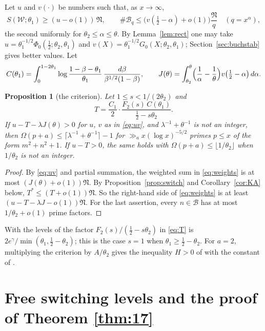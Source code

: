 \documentclass[11pt,a4paper]{amsart}
\newtheorem{proposition}[theorem]{Proposition}
\theoremstyle{remark}
\numberwithin{equation}{section}
\newcommand{\cB}{\mathcal B}
\newcommand{\cW}{\mathcal W}
\newcommand{\cN}{\mathfrak N}
\newcommand{\eg}{e^{\gamma}}
\begin{document}
Let $u$ and $v(\cdot)$ be numbers such that, as $x\to\infty$,
\begin{equation}\label{eq:uv}
S(\cW;\theta_1)\ge(u-o(1))\,\cN,\qquad \#\cB_q\le\bigl(v(\tfrac12-\alpha)+o(1)\bigr)\frac{\cN}{q}\quad(q=x^\alpha),
\end{equation}
the second uniformly for $\theta_2\le\alpha\le\theta$. By Lemma~\ref{lem:rect} one may take
$u=\theta_1^{-1/2}\Phi_0(\frac12;\theta_2,\theta_1)$ and $v(X)=\theta_1^{-1/2}G_0(X;\theta_2,\theta_1)$;
Section~\ref{sec:buchstab} gives better values. Let
\begin{equation}\label{eq:CJ}
C(\theta_1)=\int_0^{1-2\theta_1}\log\frac{1-\beta-\theta_1}{\theta_1}\,\frac{d\beta}{\beta^{1/2}(1-\beta)},\qquad
J(\theta)=\int_{\theta_2}^{\theta}\Bigl(\frac1\alpha-\frac1\theta\Bigr)v\bigl(\tfrac12-\alpha\bigr)\,d\alpha .
\end{equation}

\begin{proposition}[the criterion]\label{prop:crit}
Let $1\le s<1/(2\theta_2)$ and
\begin{equation}\label{eq:T}
T=\frac{C_1}2\cdot\frac{F_2(s)\,C(\theta_1)}{\frac12-s\theta_2} .
\end{equation}
If $u-T-\lambda J(\theta)>0$ for $u$, $v$ as in \eqref{eq:uv}, and $\lambda^{-1}+\theta^{-1}$ is not an integer,
then $\Omega(p+a)\le\lceil\lambda^{-1}+\theta^{-1}\rceil-1$ for $\gg_a x(\log x)^{-5/2}$ primes $p\le x$ of the
form $m^2+n^2+1$. If $u-T>0$, the same holds with $\Omega(p+a)\le\lfloor1/\theta_2\rfloor$ when $1/\theta_2$ is not an
integer.
\end{proposition}
\begin{proof}
By \eqref{eq:uv} and partial summation, the weighted sum in \eqref{eq:weights} is at most
$(J(\theta)+o(1))\cN$. By Proposition~\ref{prop:switch} and Corollary~\ref{cor:KA} below,
$T^\ast\le(T+o(1))\cN$. So the right-hand side of \eqref{eq:weights} is at least $(u-T-\lambda J-o(1))\cN$. For
the last assertion, every $n\in\cB$ has at most $1/\theta_2+o(1)$ prime factors.
\end{proof}
With the levels of \cite{NX,NXerr} the factor $F_2(s)/(\frac12-s\theta_2)$ in \eqref{eq:T} is
$2\eg/\min(\theta_1,\frac12-\theta_2)$; this is the case $s=1$ when $\theta_1\ge\frac12-\theta_2$.
For $a=2$, multiplying the criterion by $A/\theta_2$ gives the inequality $H>0$ of \cite[\S5]{NX} with the
constant of \cite[Proposition~1]{NXerr}.

\section{Free switching levels and the proof of Theorem \texorpdfstring{\ref{thm:17}}{1.1}}\label{sec:17}
\end{document}
